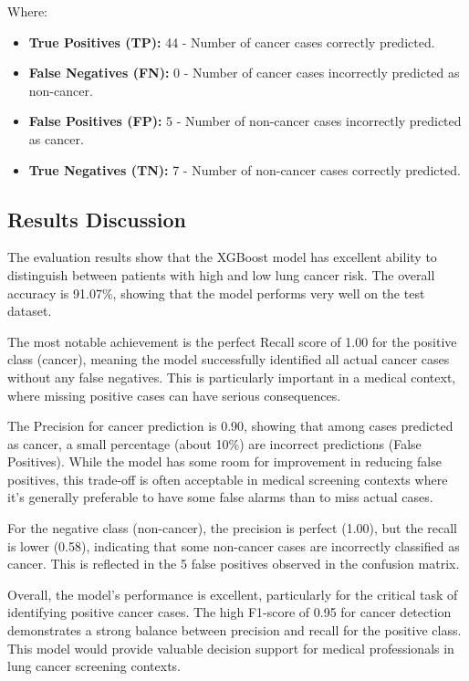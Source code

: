 Where:
\begin{itemize}
    \item \textbf{True Positives (TP):} 44 - Number of cancer cases correctly predicted.
    \item \textbf{False Negatives (FN):} 0 - Number of cancer cases incorrectly predicted as non-cancer.
    \item \textbf{False Positives (FP):} 5 - Number of non-cancer cases incorrectly predicted as cancer.
    \item \textbf{True Negatives (TN):} 7 - Number of non-cancer cases correctly predicted.
\end{itemize}

\subsection{Results Discussion}

The evaluation results show that the XGBoost model has excellent ability to distinguish between patients with high and low lung cancer risk. The overall accuracy is 91.07\%, showing that the model performs very well on the test dataset.

The most notable achievement is the perfect Recall score of 1.00 for the positive class (cancer), meaning the model successfully identified all actual cancer cases without any false negatives. This is particularly important in a medical context, where missing positive cases can have serious consequences.

The Precision for cancer prediction is 0.90, showing that among cases predicted as cancer, a small percentage (about 10\%) are incorrect predictions (False Positives). While the model has some room for improvement in reducing false positives, this trade-off is often acceptable in medical screening contexts where it's generally preferable to have some false alarms than to miss actual cases.

For the negative class (non-cancer), the precision is perfect (1.00), but the recall is lower (0.58), indicating that some non-cancer cases are incorrectly classified as cancer. This is reflected in the 5 false positives observed in the confusion matrix.

Overall, the model's performance is excellent, particularly for the critical task of identifying positive cancer cases. The high F1-score of 0.95 for cancer detection demonstrates a strong balance between precision and recall for the positive class. This model would provide valuable decision support for medical professionals in lung cancer screening contexts.
